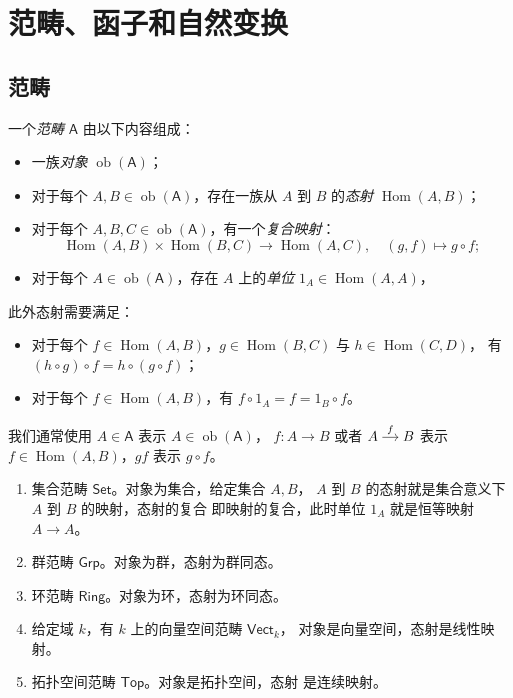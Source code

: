 \documentclass[fontset=none]{Notes}
\newenvironment{arr}[1][]{%
  $\begin{tikzcd}[cramped,#1]
}{\end{tikzcd}$}
\DeclareMathOperator\Hom{Hom}
\DeclareMathOperator\ob{ob}
\newcommand{\cat}[1]{\mathsf{#1}}
\begin{document}
\frontmatter

\tableofcontents

\mainmatter

\chapter{范畴、函子和自然变换}

\section{范畴}

\begin{definition}
  一个\emph{范畴} $\cat{A}$ 由以下内容组成：
  \begin{itemize}[nosep]
    \item 一族\emph{对象} $\ob(\cat A)$；
    \item 对于每个 $A,B\in\ob(\cat A)$，存在一族从 $A$ 到 $B$ 的\emph{态射}
    $\Hom(A,B)$；
    \item 对于每个 $A,B,C\in\ob(\cat A)$，有一个\emph{复合映射}：
    \[
      \Hom(A,B)\times \Hom(B,C)\to \Hom(A,C),
      \quad (g,f)\mapsto g\circ f;
    \]
    \item 对于每个 $A\in\ob(\cat A)$，存在 $A$ 上的\emph{单位}
    $1_A\in\Hom(A,A)$，
  \end{itemize}
  此外态射需要满足：
  \begin{itemize}[nosep]
    \item 对于每个 $f\in\Hom(A,B)$，$g\in\Hom(B,C)$ 与 $h\in\Hom(C,D)$，
    有 $(h\circ g)\circ f=h\circ(g\circ f)$；
    \item 对于每个 $f\in \Hom(A,B)$，有 $f\circ 1_A=f=1_B\circ f$。
  \end{itemize}
\end{definition}

\begin{remark}
  我们通常使用 $A\in \cat A$ 表示 $A\in\ob(\cat A)$，
  $f:A\to B$ 或者
  \begin{arr}[sep=small]
    A\arrow[r,"f"] & B
  \end{arr}
  表示 $f\in\Hom(A,B)$，$gf$ 表示 $g\circ f$。
\end{remark}

\begin{example}[数学结构的范畴]%
  \begin{enumerate}
    \item 集合范畴 $\cat{Set}$。对象为集合，给定集合 $A,B$，
    $A$ 到 $B$ 的态射就是集合意义下 $A$ 到 $B$ 的映射，态射的复合
    即映射的复合，此时单位 $1_A$ 就是恒等映射 $A\to A$。
    \item 群范畴 $\cat{Grp}$。对象为群，态射为群同态。
    \item 环范畴 $\cat{Ring}$。对象为环，态射为环同态。
    \item 给定域 $k$，有 $k$ 上的向量空间范畴 $\cat{Vect}_k$，
    对象是向量空间，态射是线性映射。
    \item 拓扑空间范畴 $\cat{Top}$。对象是拓扑空间，态射
    是连续映射。
  \end{enumerate}
\end{example}
\end{document}
